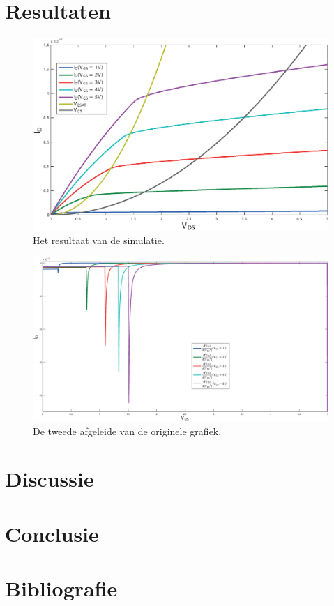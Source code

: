 \documentclass{scrartcl}  %
\begin{document}
\section{Resultaten}
\begin{figure}[H]
\centering
		\includegraphics[width=\textwidth]{resources/Id}
		\caption{Het resultaat van de simulatie.}
		\label{fig:Id}
\end{figure}
\begin{figure}[H]
\centering
		\includegraphics[width=\textwidth]{resources/Id_Vds_2nd_div}
		\caption{De tweede afgeleide van de originele grafiek.}
		\label{fig:Id_Vds_2nd_div}
\end{figure}

\section{Discussie}

\section{Conclusie}


\section{Bibliografie}


\printbibliography
\end{document}
